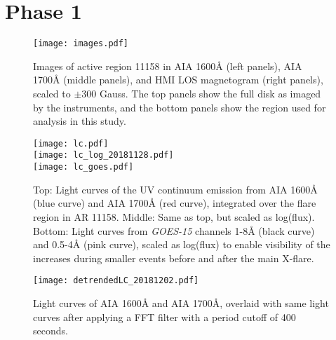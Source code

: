 \section{Phase 1}




\begin{figure*}[htb!]\centering
    \texttt{[image: images.pdf]}
    \caption{
        Images of active region 11158 in AIA 1600\AA{} (left panels),
        AIA 1700\AA{} (middle panels), and HMI LOS magnetogram (right panels),
        scaled to $\pm300$ Gauss.
        The top panels show the full disk as imaged by the instruments,
        and the bottom panels show the region used for analysis in this study.
        \label{images}}
\end{figure*}

\clearpage
\begin{figure*}[htb!]\centering
    \texttt{[image: lc.pdf]}\\
    \texttt{[image: lc\_log\_20181128.pdf]}\\
    \texttt{[image: lc\_goes.pdf]}
    \caption{%
        Top: Light curves of the
        UV continuum emission from AIA 1600\AA{} (blue curve) and
        AIA 1700\AA{} (red curve),
        integrated over the flare region in AR 11158.
        Middle: Same as top, but scaled as log(flux).
        Bottom: Light curves from \textit{GOES-15}
        channels 1-8\AA{} (black curve) and 0.5-4\AA{} (pink curve),
        scaled as log(flux) to enable visibility of the increases
        during smaller events before and
        after the main X-flare.
        \label{lc}}
\end{figure*}


\clearpage
\begin{figure}[htb!]\centering
    \texttt{[image: detrendedLC\_20181202.pdf]}
    \caption{%
        Light curves of AIA 1600\AA{} and AIA 1700\AA{}, overlaid with
        same light curves after applying a FFT filter with a period
        cutoff of 400 seconds.
    \label{detrended}}
\end{figure}

